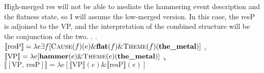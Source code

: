 \documentclass[MilwayThesis]{subfiles}
\begin{document}
High-merged res will not be able to mediate the hammering event description and the flatness state, so I will assume the low-merged version.
In this case, the resP is adjoined to the VP, and the interpretation of the combined structure will be the conjunction of the two.
\ex.
\a. $\llbracket\text{resP}\rrbracket = \lambda e \exists f [\textsc{Cause}(f)(e) \& \textbf{flat}(f) \& \textsc{Theme}(f)(\textbf{the\_metal})]$
\b. $\llbracket\text{VP}\rrbracket = \lambda e [\textbf{hammer}(e) \& \textsc{Theme}(e)(\textbf{the\_metal})]$
\c. $\llbracket\left[ \text{VP, resP} \right]\rrbracket = \lambda e [\llbracket\text{VP}\rrbracket(e) \& \llbracket\text{resP}\rrbracket(e)]$
\end{document}
